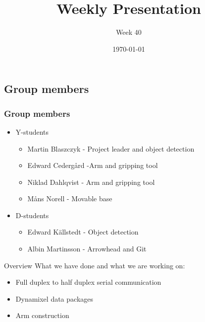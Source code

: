 \documentclass{beamer}
\title{Weekly Presentation}
\subtitle{Week 40}
\author{}
\institute{Luleå University of Technology}
\date{\today}
\begin{document}
\begin{frame}
    \titlepage
\end{frame}




\begin{frame}
    \subsection{Group members}
    \frametitle{Group members }
    \begin{itemize}
        \item Y-students
        \begin{itemize}
            \item Martin Blaszczyk - Project leader and object detection
            \item Edward Cedergård -Arm and gripping tool
            \item Niklad Dahlqvist -  Arm and gripping tool
            \item Måns Norell - Movable base
        \end{itemize}
        \item D-students
        \begin{itemize}
            \item Edward Källstedt - Object detection
            \item Albin Martinsson - Arrowhead and Git
        \end{itemize}  
    \end{itemize}
\end{frame}




\begin{frame}{Overview}
What we have done and what we are working on:
    \begin{itemize}
        \item Full duplex to half duplex serial communication
        \item Dynamixel data packages
        \item Arm construction
    \end{itemize}
\end{frame}


\end{document}
